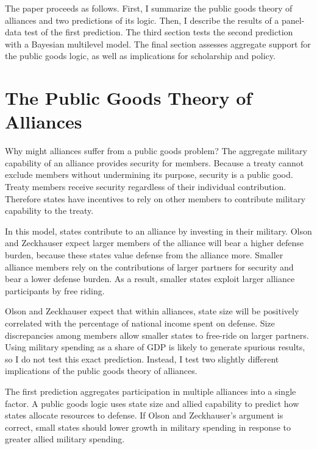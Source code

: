 \documentclass[12pt]{article}
\begin{document}
The paper proceeds as follows.
First, I summarize the public goods theory of alliances and two predictions of its logic.
Then, I describe the results of a panel-data test of the first prediction.
The third section tests the second prediction with a Bayesian multilevel model. 
The final section assesses aggregate support for the public goods logic, as well as implications for scholarship and policy. 



\section{The Public Goods Theory of Alliances}

Why might alliances suffer from a public goods problem? 
The aggregate military capability of an alliance provides security for members. 
Because a treaty cannot exclude members without undermining its purpose, security is a public good. 
Treaty members receive security regardless of their individual contribution. 
Therefore states have incentives to rely on other members to contribute military capability to the treaty. 


In this model, states contribute to an alliance by investing in their military. 
Olson and Zeckhauser expect larger members of the alliance will bear a higher defense burden, because these states value defense from the alliance more. 
Smaller alliance members rely on the contributions of larger partners for security and bear a lower defense burden.
As a result, smaller states exploit larger alliance participants by free riding. 


Olson and Zeckhauser expect that within alliances, state size will be positively correlated with the percentage of national income spent on defense.
Size discrepancies among members allow smaller states to free-ride on larger partners. 
Using military spending as a share of GDP is likely to generate spurious results, so I do not test this exact prediction. 
Instead, I test two slightly different implications of the public goods theory of alliances. 


The first prediction aggregates participation in multiple alliances into a single factor. 
A public goods logic uses state size and allied capability to predict how states allocate resources to defense. 
If Olson and Zeckhauser's argument is correct, small states should lower growth in military spending in response to greater allied military spending. 
\end{document}
